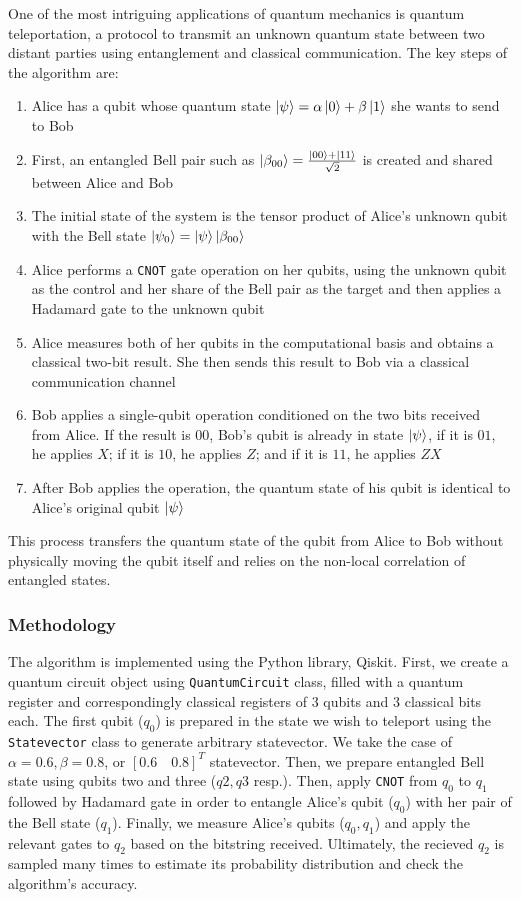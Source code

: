\documentclass[11pt,a4paper]{article}
\begin{document}
One of the most intriguing applications of quantum mechanics is quantum teleportation, a protocol to transmit an unknown quantum state between two distant parties using entanglement and classical communication. The key steps of the algorithm are:

\begin{enumerate}
    \item Alice has a qubit whose quantum state $\ket{\psi} = \alpha\ket{0} + \beta\ket{1}$ she wants to send to Bob
    \item First, an entangled Bell pair such as $\ket{\beta_{00}} = \frac{\ket{00} + \ket{11}}{\sqrt{2}}$ is created and shared between Alice and Bob
    \item The initial state of the system is the tensor product of Alice's unknown qubit with the Bell state $\ket{\psi_0} = \ket{\psi}\ket{\beta_{00}}$
    \item Alice performs a \texttt{CNOT} gate operation on her qubits, using the unknown qubit as the control and her share of the Bell pair as the target and then applies a Hadamard gate to the unknown qubit
    \item Alice measures both of her qubits in the computational basis and obtains a classical two-bit result. She then sends this result to Bob via a classical communication channel
    \item Bob applies a single-qubit operation conditioned on the two bits received from Alice. If the result is $00$, Bob’s qubit is already in state $\ket{\psi}$, if it is $01$, he applies $X$; if it is $10$, he applies $Z$; and if it is $11$, he applies $ZX$
    \item After Bob applies the operation, the quantum state of his qubit is identical to Alice's original qubit $\ket{\psi}$
\end{enumerate}

This process transfers the quantum state of the qubit from Alice to Bob without physically moving the qubit itself and relies on the non-local correlation of entangled states.

\subsubsection{Methodology}

The algorithm is implemented using the Python library, Qiskit. First, we create a quantum circuit object using \texttt{QuantumCircuit} class, filled with a quantum register and correspondingly classical registers of 3 qubits and 3 classical bits each. The first qubit ($q_0$) is prepared in the state we wish to teleport using the \texttt{Statevector} class to generate arbitrary statevector. We take the case of $\alpha = 0.6, \beta = 0.8$, or $[0.6 \quad 0.8]^T$ statevector. Then, we prepare entangled Bell state using qubits two and three ($q2, q3$ resp.). Then, apply \texttt{CNOT} from $q_0$ to $q_1$ followed by Hadamard gate in order to entangle Alice's qubit ($q_0$) with her pair of the Bell state ($q_1$). Finally, we measure Alice's qubits ($q_0, q_1$) and apply the relevant gates to $q_2$ based on the bitstring received. Ultimately, the recieved $q_2$ is sampled many times to estimate its probability distribution and check the algorithm's accuracy.
\end{document}
